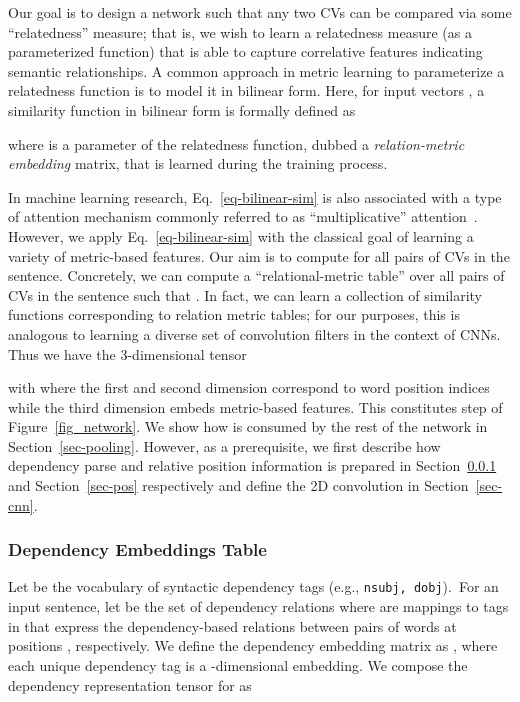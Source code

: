 \documentclass{clv3}
\newcommand*\circled[1]{\tikz[baseline=(char.base)]{
            \node[shape=circle,draw,inner sep=1pt] (char) {#1};}}
\begin{document}
Our goal is to design a network such that any two CVs can be compared via some ``relatedness'' measure; that is, we wish to learn a relatedness measure (as a parameterized function)  that is able to capture correlative features indicating semantic relationships. A common approach in metric learning to parameterize a relatedness function is to model it in bilinear form. Here, for input vectors , a similarity function in bilinear form is formally defined as  

where  is a parameter of the relatedness function, dubbed a \emph{relation-metric embedding} matrix, that is learned during the training process. 

In machine learning research, Eq.~\ref{eq-bilinear-sim} is also associated with a type of attention mechanism commonly referred to as ``multiplicative'' attention~\cite{luong2015effective}. However, we apply Eq.~\ref{eq-bilinear-sim} with the classical goal of learning a variety of metric-based features. 
Our aim is to compute  for all pairs of CVs in the sentence. Concretely, we can compute a ``relational-metric table''   over all pairs of CVs in the sentence such that .
In fact, we can learn a collection of  similarity functions corresponding to  relation metric tables; for our purposes, this is analogous to learning a diverse set of convolution filters in the context of CNNs. Thus we have the 3-dimensional tensor

with  where the first and second dimension correspond to word position indices while the third dimension embeds metric-based features.
This constitutes step \circled{3} of Figure~\ref{fig_network}. We show how  is consumed by the rest of the network in Section~\ref{sec-pooling}. However, as a prerequisite, we first describe how dependency parse and relative position information is prepared in Section~\ref{sec-dep} and Section~\ref{sec-pos} respectively and define the 2D convolution in Section~\ref{sec-cnn}.

\subsubsection{Dependency Embeddings Table}\label{sec-dep}

Let  be the vocabulary of syntactic dependency tags (e.g., \texttt{nsubj, dobj}).~For an input sentence, let  be the set of dependency relations where   are mappings to tags in  that express the dependency-based relations between  pairs of words at positions , respectively. We define the dependency embedding matrix as , where each unique dependency tag is a -dimensional embedding. We compose the dependency representation tensor  for  as
\end{document}
